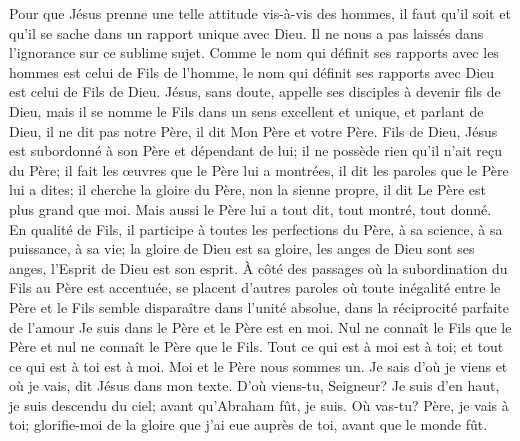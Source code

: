 Pour que Jésus prenne une telle attitude vis-à-vis des hommes, il faut qu’il soit et qu’il se sache dans un rapport unique avec Dieu. Il ne nous a pas laissés dans l’ignorance sur ce sublime sujet. Comme le nom qui définit ses rapports avec les hommes est celui de Fils de l’homme, le nom qui définit ses rapports avec Dieu est celui de Fils de Dieu. Jésus, sans doute, appelle ses disciples à devenir fils de Dieu, mais il se nomme \Og{} le Fils\Fg{} dans un sens excellent et unique, et parlant de Dieu, il ne dit pas \Og{} notre Père\Fg{}, il dit\frcolon{} \Og{} Mon Père et votre Père.\Fg{}
Fils de Dieu, Jésus est subordonné à son Père et dépendant de lui;
il ne possède rien qu’il n’ait reçu du Père;
il fait les œuvres que le Père lui a montrées, il dit les paroles que le Père lui a dites;
il cherche la gloire du Père, non la sienne propre, il dit\frcolon{} \Og{} Le Père est plus grand que moi.\Fg{}
Mais aussi le Père lui a tout dit, tout montré, tout donné.
En qualité de Fils, il participe à toutes les perfections du Père, à sa science, à sa puissance, à sa vie;
la gloire de Dieu est sa gloire, les anges de Dieu sont ses anges, l’Esprit de Dieu est son esprit.
À côté des passages où la subordination du Fils au Père est accentuée, se placent d’autres paroles où toute inégalité entre le Père et le Fils semble disparaître dans l’unité absolue, dans la réciprocité parfaite de l’amour\frcolon{} \Og{} Je suis dans le Père et le Père est en moi.
Nul ne connaît le Fils que le Père et nul ne connaît le Père que le Fils.
Tout ce qui est à moi est à toi; et tout ce qui est à toi est à moi.
Moi et le Père nous sommes un.\Fg{} \ocadr{} \Og{} Je sais d’où je viens et où je vais\Fg{}, dit Jésus dans mon texte.
\ocadr{} D’où viens-tu, Seigneur? \ocadr{} \Og{} Je suis d’en haut, je suis descendu du ciel; avant qu’Abraham fût, je suis.\Fg{}
\ocadr{} Où vas-tu? \ocadr{} \Og{} Père, je vais à toi; glorifie-moi de la gloire que j’ai eue auprès de toi, avant que le monde fût.\Fg{}

